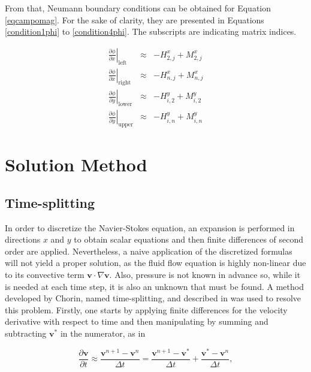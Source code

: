\documentclass[journal]{IEEEtran}
\begin{document}
From that, Neumann boundary conditions can be obtained for Equation \ref{eqcampomag}. For the sake of clarity, they are presented in Equations \ref{condition1phi} to \ref{condition4phi}. The subscripts are indicating matrix indices.

\begin{eqnarray}
\left.\frac{\partial \phi}{\partial x}\right|_{\mathrm{left}}\;\;&\approx&- H^{x}_{2,j} + M^{x}_{2,j}\label{condition1phi}\\
\left.\frac{\partial \phi}{\partial x}\right|_{\mathrm{right}}&\approx&- H^{x}_{n,j} + M^{x}_{n,j}\\
\left.\frac{\partial \phi}{\partial y}\right|_{\mathrm{lower}}&\approx&- H^{y}_{i,2} + M^{y}_{i,2}\\
\left.\frac{\partial \phi}{\partial y}\right|_{\mathrm{upper}}&\approx&- H^{y}_{i,n} + M^{y}_{i,n}\label{condition4phi}
\end{eqnarray}

\section{Solution Method}
\subsection{Time-splitting}
In order to discretize the Navier-Stokes equation, an expansion is performed in directions $x$ and $y$ to obtain scalar equations and then finite differences of second order are applied. Nevertheless, a naive application of the discretized formulas will not yield a proper solution, as the fluid flow equation is highly non-linear due to its convective term $\mathbf{v}\cdot \nabla \mathbf{v}$. Also, pressure is not known in advance so, while it is needed at each time step, it is also an unknown that must be found. A method developed by Chorin, named time-splitting, and described in \cite{Chorin1997118} was used to resolve this problem. Firstly, one starts by applying finite differences for the velocity derivative with respect to time and then manipulating by summing and subtracting $\mathbf{v}^*$ in the numerator, as in

\begin{equation}
\frac{\partial \textbf{v}}{\partial t}\approx \frac{\textbf{v}^{n+1}-\textbf{v}^n}{\Delta t}=\frac{\textbf{v}^{n+1}-\textbf{v}^*}{\Delta t}+\frac{\textbf{v}^{*}-\textbf{v}^n}{\Delta t}, \label{vdottimesplitting}
\end{equation}
\end{document}
